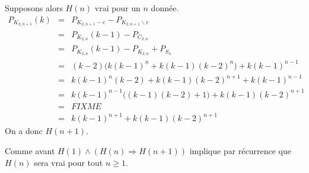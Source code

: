 \begin{itemize}
Supposons alors $H(n)$ vrai pour un $n$ donnée. 
\begin{eqnarray*}
P_{K_{2,n+1}}(k)			& = & P_{K_{2,n+1}-e} - P_{K_{2,n+1} \backslash{e}}				\\
							& = & P_{K_{2,n}}(k-1) - P_{C_{2,n}}							\\
							& = & P_{K_{2,n}}(k-1) - P_{K_{2,n}} + P_{S_n}					\\
							& = & (k-2)\big(k(k-1)^n + k(k-1)(k-2)^n\big) + k(k-1)^{n-1}	\\
							& = & k(k-1)^n(k-2) + k(k-1)(k-2)^{n+1} + k(k-1)^{n-1}			\\
							& = & k(k-1)^{n-1}\big((k-1)(k-2) + 1\big) + k(k-1)(k-2)^{n+1}	\\
							& = & FIXME														\\
							& = & k(k-1)^{n+1} + k(k-1)(k-2)^{n+1}
\end{eqnarray*}
On a donc $H(n+1)$.
\end{itemize}
Comme avant $H(1) \wedge (H(n) \Rightarrow H(n+1))$ implique par récurrence que $H(n)$ sera vrai pour tout $n \geq 1$.
